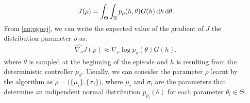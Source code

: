 \begin{align}
J(\rho) = \int_{\Theta} \int_{\mathbb{H}} p_{\rho}(h, \theta) G(h) \,\mathrm{d} h \,\mathrm{d} \theta. \label{eq:pgpej}
\end{align}
From \ref{eq:pgpej}, we can write the expected value of the gradient of $J$ \wrt the distribution parameter $\rho$ as:
\begin{align}
\widehat{\nabla_{\rho}}J(\rho) \approx \nabla_{\rho} \log p_{\rho} (\theta) G(h),
\end{align}
where $\theta$ is sampled at the beginning of the episode and $h$ is resulting from the deterministic controller $\mu_{\theta}$. Usually, we can consider the parameter $\rho$ learnt by the algorithm as $\rho = \Big( \{\mu_i\}, \{\sigma_i\} \Big)$, where $\mu_i$ and $\sigma_i$ are the parameters that determine an indipendent normal distribution $p_{\rho_i}(\theta)$ for each parameter $\theta_i \in \Theta$.  

